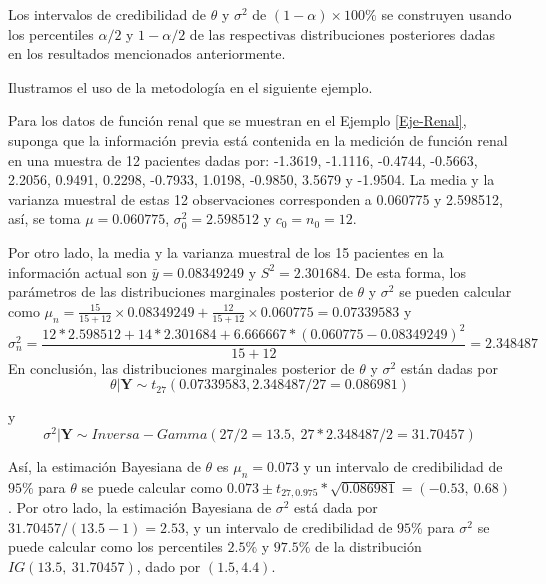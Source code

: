 \documentclass[10pt,openright]{book}\usepackage[]{graphicx}\usepackage[]{color}
\begin{document}
Los intervalos de credibilidad de $\theta$ y $\sigma^2$ de $(1-\alpha)\times 100\%$ se construyen usando los percentiles $\alpha/2$ y $1-\alpha/2$ de las respectivas distribuciones posteriores dadas en los resultados mencionados anteriormente.

Ilustramos el uso de la metodolog\'ia en el siguiente ejemplo.

\begin{Eje}\label{Eje2.1.2}
Para los datos de funci\'on renal \cite{Efronims} que se muestran en el Ejemplo \ref{Eje-Renal}, suponga que la informaci\'on previa est\'a contenida en la medici\'on de funci\'on renal en una muestra de 12 pacientes dadas por: -1.3619, -1.1116, -0.4744, -0.5663, 2.2056, 0.9491, 0.2298, -0.7933, 1.0198, -0.9850, 3.5679 y -1.9504. La media y la varianza muestral de estas 12 observaciones corresponden a 0.060775 y 2.598512, as\'i, se toma $\mu=0.060775$, $\sigma^2_0=2.598512$ y $c_0=n_0=12$. 

Por otro lado, la media y la varianza muestral de los 15 pacientes en la informaci\'on actual son $\bar{y}=0.08349249$ y $S^2=2.301684$. De esta forma, los par\'ametros de las distribuciones marginales posterior de $\theta$ y $\sigma^2$ se pueden calcular como $\mu_n=\frac{15}{15+12}\times 0.08349249+\frac{12}{15+12}\times 0.060775=0.07339583$ y $$\sigma^2_n=\dfrac{12*2.598512+14*2.301684+6.666667*(0.060775-0.08349249)^2}{15+12}=2.348487$$ En conclusi\'on, las distribuciones marginales posterior de $\theta$ y $\sigma^2$ est\'an dadas por
\begin{equation*}
\theta|\mathbf{Y}\sim t_{27}(0.07339583,2.348487/27=0.086981)
\end{equation*}

y
\begin{equation*}
\sigma^2|\mathbf{Y}\sim Inversa-Gamma(27/2=13.5,\ 27*2.348487/2=31.70457)
\end{equation*}

As\'i, la estimaci\'on Bayesiana de $\theta$ es $\mu_n=0.073$ y un intervalo de credibilidad de $95\%$ para $\theta$ se puede calcular como $0.073\pm t_{27,0.975}*\sqrt{0.086981}=(-0.53,\ 0.68)$. Por otro lado, la estimaci\'on Bayesiana de $\sigma^2$ est\'a dada por $31.70457/(13.5-1)=2.53$, y un intervalo de credibilidad de $95\%$ para $\sigma^2$ se puede calcular como los percentiles $2.5\%$ y $97.5\%$ de la distribuci\'on $IG(13.5,\ 31.70457)$, dado por $(1.5, 4.4)$.


\end{Eje}
\end{document}
